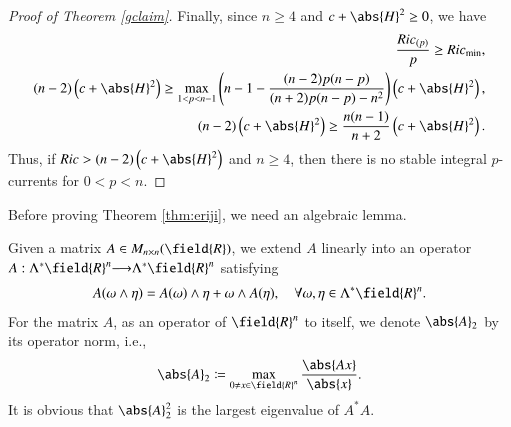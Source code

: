 \documentclass[12pt]{amsart}
\theoremstyle{plain}
\theoremstyle{remark}
\theoremstyle{definition}
\numberwithin{equation}{section}
\begin{document}
\begin{proof}[Proof of Theorem \ref{gclaim}]
Finally, since $n\geq4$ and $c+\abs{H}^2\geq0$, we have
\begin{align*}
\dfrac{Ric_{(p)}}{p}\geq Ric_{\min},\\
(n-2)\left(c+\abs{H}^2\right)\geq\max_{1<p<n-1}\left(n-1-\dfrac{(n-2)p(n-p)}{(n+2)p(n-p)-n^2}\right)\left(c+\abs{H}^2\right),\\
(n-2)\left(c+\abs{H}^2\right)\geq\dfrac{n(n-1)}{n+2}\left(c+\abs{H}^2\right).
\end{align*}
Thus, if $Ric>(n-2)\left(c+\abs{H}^2\right)$ and $n\geq4$, then there is no stable integral $p$-currents for $0<p<n$.
\end{proof}

Before proving Theorem \ref{thm:eriji}, we need an algebraic lemma.

Given a matrix $A\in M_{n\times n}({\field{R}})$, we extend $A$ linearly into an operator $A:\Lambda^*{\field{R}}^n{\longrightarrow} \Lambda^*{\field{R}}^n$ satisfying
\begin{align*}
A(\omega\wedge\eta)=A(\omega)\wedge\eta+\omega\wedge A(\eta),\quad\forall\omega, \eta\in \Lambda^*{\field{R}}^n.
\end{align*}
For the matrix $A$, as an operator of ${\field{R}}^n$ to itself, we denote $\abs{A}_2$ by its operator norm, i.e.,
\begin{align*}
\abs{A}_2\coloneqq\max_{0\neq x\in{\field{R}}^n}\dfrac{\abs{Ax}}{\abs{x}}.
\end{align*}
It is obvious that $\abs{A}_2^2$ is the largest eigenvalue of $A^*A$.
\end{document}
